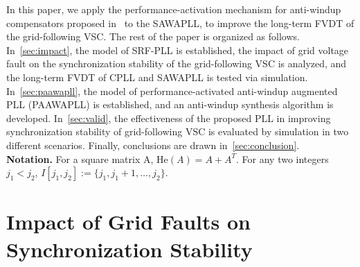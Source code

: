 \documentclass[10pt,final,journal,twoside]{IEEEtran}
\begin{document}
In this paper, we apply the performance-activation mechanism for anti-windup compensators proposed in~\cite{lai2024} to the SAWAPLL, to improve the long-term FVDT of
the grid-following VSC. The rest of the paper is organized as follows. In~\autoref*{sec:impact}, the model of SRF-PLL is established, the impact of grid voltage fault on the synchronization stability
of the grid-following VSC is analyzed, and the long-term FVDT of CPLL and SAWAPLL is tested via simulation. In~\autoref*{sec:paawapll}, the model of performance-activated anti-windup augmented PLL
(PAAWAPLL) is established, and an anti-windup synthesis algorithm is developed. In~\autoref*{sec:valid}, the effectiveness of the proposed PLL in improving synchronization stability of grid-following VSC is
evaluated by simulation in two different scenarios. Finally, conclusions are drawn in~\autoref*{sec:conclusion}.\\
{\bf Notation.} For a square matrix A, $\textrm{He}(A)=A+A^T$. For any two integers $j_1<j_2$, $I[j_1,j_2]:=\{j_1,j_1+1,\ldots,j_2\}$.

\section{Impact of Grid Faults on Synchronization Stability}\label{sec:impact}
\end{document}
